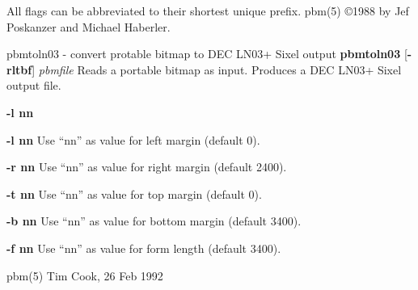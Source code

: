 \par
All flags can be abbreviated to their shortest unique prefix.
pbm(5)
\copyright 1988 by Jef Poskanzer and Michael Haberler.
%
 
%

\newpage
%

pbmtoln03 - convert protable bitmap to DEC LN03+ Sixel output
{\bf pbmtoln03}
{\rm [}{\bf -rltbf}{\rm ]}
{\it pbmfile}
Reads a portable bitmap as input.
Produces a DEC LN03+ Sixel output file.
\begin{TPlist}{{\bf -l nn}}
\item[{{\bf -l nn}}]
Use ``nn'' as value for left margin (default 0).
\item[{{\bf -r nn}}]
Use ``nn'' as value for right margin (default 2400).
\item[{{\bf -t nn}}]
Use ``nn'' as value for top margin (default 0).
\item[{{\bf -b nn}}]
Use ``nn'' as value for bottom margin (default 3400).
\item[{{\bf -f nn}}]
Use ``nn'' as value for form length (default 3400).
\end{TPlist}

pbm(5)
Tim Cook, 26 Feb 1992
%
 
%

